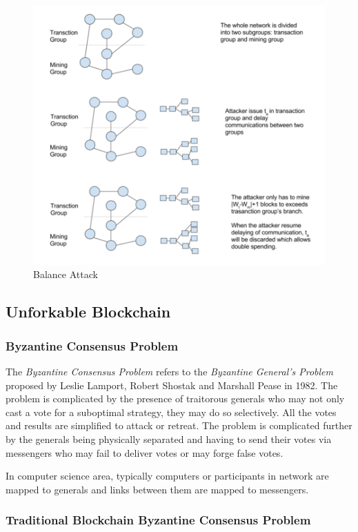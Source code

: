 \documentclass[12pt]{article}
\begin{document}
\begin{figure}
    \includegraphics{balance_attack.png}
    \caption{Balance Attack}
    \label{fig:balance_attack}
\end{figure}

\subsection{Unforkable Blockchain}
\label{sec:Unforkable Blockchain}

\subsubsection{Byzantine Consensus Problem}

The \textit{Byzantine Consensus Problem} refers to the \textit{Byzantine General's Problem} proposed by Leslie Lamport, Robert Shostak and Marshall Pease in 1982. The problem is complicated by the presence of traitorous generals who may not only cast a vote for a suboptimal strategy, they may do so selectively. All the votes and results are simplified to attack or retreat. The problem is complicated further by the generals being physically separated and having to send their votes via messengers who may fail to deliver votes or may forge false votes\cite{lamport1982byzantine}.

In computer science area, typically computers or participants in network are mapped to generals and links between them are mapped to messengers.

\subsubsection{Traditional Blockchain Byzantine Consensus Problem}
\end{document}
